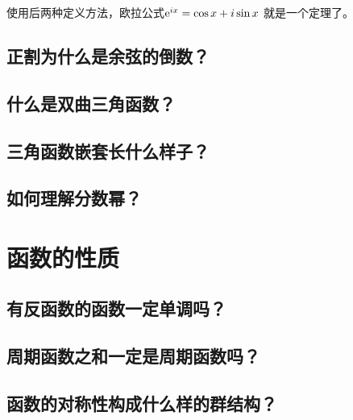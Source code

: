 使用后两种定义方法，欧拉公式\(\mathrm{e}^{ix} = \cos x + i \sin x\) 就是一个定理了。

\subsection{正割为什么是余弦的倒数？}
\subsection{什么是双曲三角函数？}
\subsection{三角函数嵌套长什么样子？}
\subsection{如何理解分数幂？}

\section{函数的性质}
\subsection{有反函数的函数一定单调吗？}
\subsection{周期函数之和一定是周期函数吗？}
\subsection{函数的对称性构成什么样的群结构？}
